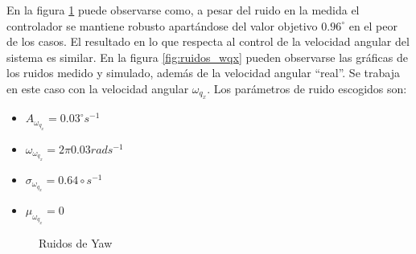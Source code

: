\documentclass[main]{subfiles}
\begin{document}
En la figura \ref{fig:ruidos_yaw} puede observarse como, a pesar del ruido en la medida el controlador se mantiene robusto apart\'andose del valor objetivo $0.96^\circ$ en el peor de los casos. El resultado en lo que respecta al control de la velocidad angular del sistema es similar. En la figura \ref{fig:ruidos_wqx} pueden observarse las gr\'aficas de los ruidos medido y simulado, adem\'as de la velocidad angular ``real''. Se trabaja en este caso con la velocidad angular $\omega_{q_x}$. Los par\'ametros de ruido escogidos son:
\begin{itemize}
\item $A_{\omega_{q_x}} = 0.03^\circ s^{-1}$
\item $\omega_{\omega_{q_x}} = 2\pi 0.03 rad s^{-1}$
\item $\sigma_{\omega_{q_x}} = 0.64\circ s^{-1}$
\item $\mu_{\omega_{q_x}} = 0$
\end{itemize}
\begin{figure}[h!]
  \centering
  \caption{Ruidos de Yaw}
  \label{fig:ruidos_yaw}
\end{figure}
\end{document}
